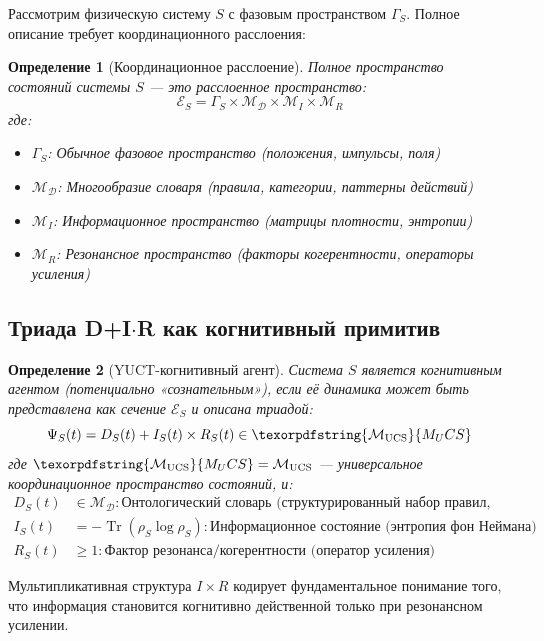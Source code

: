 \documentclass[12pt,a4paper]{article}
\newtheorem{definition}{Определение}
\DeclareMathOperator{\Tr}{Tr}
\DeclareRobustCommand{\UCS}{\texorpdfstring{\ensuremath{\mathcal{M}_{\mathrm{UCS}}}}{M_UCS}}
\newcommand{\Dict}{\mathcal{D}}
\newcommand{\Mdict}{\mathcal{M}_{\Dict}}
\begin{document}
	Рассмотрим физическую систему \(S\) с фазовым пространством \(\Gamma_S\). Полное описание требует координационного расслоения:
	
	\begin{definition}[Координационное расслоение]
		Полное пространство состояний системы \(S\) — это расслоенное пространство:
		\[
		\mathcal{E}_S = \Gamma_S \times \Mdict \times \mathcal{M}_I \times \mathcal{M}_R
		\]
		где:
		\begin{itemize}
			\item \(\Gamma_S\): Обычное фазовое пространство (положения, импульсы, поля)
			\item \(\Mdict\): Многообразие словаря (правила, категории, паттерны действий)
			\item \(\mathcal{M}_I\): Информационное пространство (матрицы плотности, энтропии)
			\item \(\mathcal{M}_R\): Резонансное пространство (факторы когерентности, операторы усиления)
		\end{itemize}
	\end{definition}
	
	\subsection{Триада D+I\(\cdot\)R как когнитивный примитив}
	
	\begin{definition}[YUCT-когнитивный агент]
		Система \(S\) является когнитивным агентом (потенциально «сознательным»), если её динамика может быть представлена как сечение \(\mathcal{E}_S\) и описана триадой:
		\begin{equation}
			\label{eq:dir-triad}
			\Psi_S(t) = D_S(t) + I_S(t) \times R_S(t) \in \UCS
		\end{equation}
		где \(\UCS = \mathcal{M}_{\mathrm{UCS}}\) — универсальное координационное пространство состояний, и:
		\begin{align*}
			D_S(t) &\in \Mdict: \text{Онтологический словарь (структурированный набор правил, категорий, паттернов действий)} \\
			I_S(t) &= -\Tr(\rho_S \log \rho_S): \text{Информационное состояние (энтропия фон Неймана)} \\
			R_S(t) &\geq 1: \text{Фактор резонанса/когерентности (оператор усиления)}
		\end{align*}
	\end{definition}
	
	Мультипликативная структура \(I \times R\) кодирует фундаментальное понимание того, что информация становится когнитивно действенной только при резонансном усилении.
	
\end{document}
